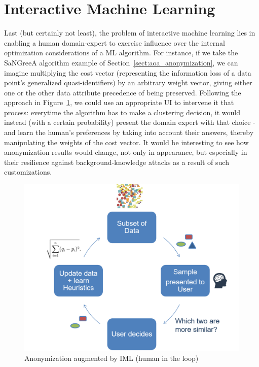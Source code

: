 \section{Interactive Machine Learning}
\label{sect:fut_iml}

Last (but certainly not least), the problem of interactive machine learning lies in enabling a human domain-expert to exercise influence over the internal optimization considerations of a ML algorithm. For instance, if we take the SaNGreeA algorithm example of Section~\ref{sect:aoa_anonymization}, we can imagine multiplying the cost vector (representing the information loss of a data point's generalized quasi-identifiers) by an arbitrary weight vector, giving either one or the other data attribute precedence of being preserved. Following the approach in Figure~\ref{fig:anonIML}, we could use an appropriate UI to intervene it that process: everytime the algorithm has to make a clustering decision, it would instead (with a certain probability) present the domain expert with that choice - and learn the human's preferences by taking into account their answers, thereby manipulating the weights of the cost vector. It would be interesting to see how anonymization results would change, not only in appearance, but especially in their resilience against background-knowledge attacks as a result of such customizations.

\vspace{0.3cm}
\begin{figure}[ht]
	\begin{center}
		\hspace*{-2cm}
		\includegraphics[width=1.2\textwidth]{figures/anonym/anonIML}
		\caption{Anonymization augmented by IML (human in the loop)}
		\label{fig:anonIML}
	\end{center}
\end{figure}
